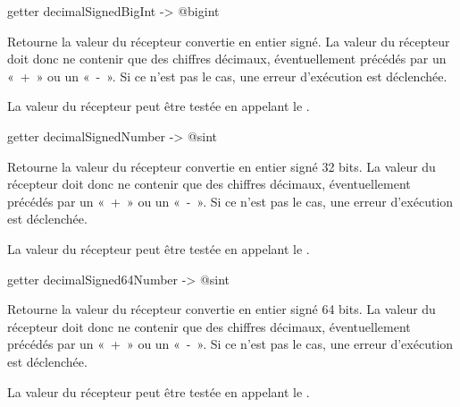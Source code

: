 
\begin{galgasbox}
getter decimalSignedBigInt -> @bigint
\end{galgasbox}

Retourne la valeur du récepteur convertie en entier signé. La valeur du récepteur doit donc ne contenir que des chiffres décimaux, éventuellement précédés par un «~+~» ou un «~-~». Si ce n'est pas le cas, une erreur d'exécution est déclenchée.

La valeur du récepteur peut être testée en appelant le .








\begin{galgasbox}
getter decimalSignedNumber -> @sint
\end{galgasbox}

Retourne la valeur du récepteur convertie en entier signé 32 bits. La valeur du récepteur doit donc ne contenir que des chiffres décimaux, éventuellement précédés par un «~+~» ou un «~-~». Si ce n'est pas le cas, une erreur d'exécution est déclenchée.

La valeur du récepteur peut être testée en appelant le .








\begin{galgasbox}
getter decimalSigned64Number -> @sint
\end{galgasbox}

Retourne la valeur du récepteur convertie en entier signé 64 bits. La valeur du récepteur doit donc ne contenir que des chiffres décimaux, éventuellement précédés par un «~+~» ou un «~-~». Si ce n'est pas le cas, une erreur d'exécution est déclenchée.

La valeur du récepteur peut être testée en appelant le .








